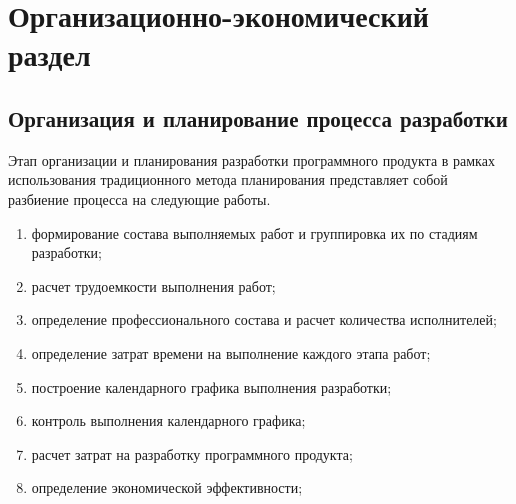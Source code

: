 \chapter{Организационно-экономический раздел}
\label{cha:econom}

\section{Организация и планирование процесса разработки}
Этап организации и планирования разработки программного продукта в рамках
использования традиционного метода планирования представляет собой разбиение
процесса на следующие работы.
\begin{enumerate}[1.]
\item формирование состава выполняемых работ и группировка их по стадиям
разработки;
\item расчет трудоемкости выполнения работ;
\item определение профессионального состава и расчет количества исполнителей;
\item определение затрат времени на выполнение каждого этапа работ;
\item построение календарного графика выполнения разработки;
\item контроль выполнения календарного графика;
\item расчет затрат на разработку программного продукта;
\item определение экономической эффективности;
\end{enumerate}

